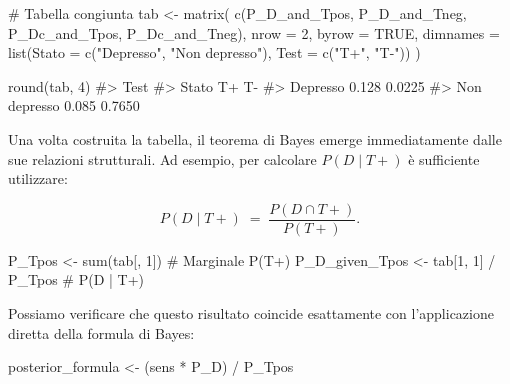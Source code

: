 \documentclass[
  letterpaper,
  DIV=11,
  numbers=noendperiod,
  oneside]{scrreprt}
\newenvironment{Shaded}{\begin{snugshade}}{\end{snugshade}}
\newcommand{\AttributeTok}[1]{\textcolor[rgb]{0.40,0.45,0.13}{#1}}
\newcommand{\CommentTok}[1]{\textcolor[rgb]{0.37,0.37,0.37}{#1}}
\newcommand{\ConstantTok}[1]{\textcolor[rgb]{0.56,0.35,0.01}{#1}}
\newcommand{\DecValTok}[1]{\textcolor[rgb]{0.68,0.00,0.00}{#1}}
\newcommand{\FunctionTok}[1]{\textcolor[rgb]{0.28,0.35,0.67}{#1}}
\newcommand{\NormalTok}[1]{\textcolor[rgb]{0.00,0.23,0.31}{#1}}
\newcommand{\OtherTok}[1]{\textcolor[rgb]{0.00,0.23,0.31}{#1}}
\newcommand{\SpecialCharTok}[1]{\textcolor[rgb]{0.37,0.37,0.37}{#1}}
\newcommand{\StringTok}[1]{\textcolor[rgb]{0.13,0.47,0.30}{#1}}
\theoremstyle{definition}
\theoremstyle{plain}
\theoremstyle{definition}
\theoremstyle{remark}
\begin{document}
\begin{Shaded}
\begin{Highlighting}[]
\CommentTok{\# Tabella congiunta}
\NormalTok{tab }\OtherTok{\textless{}{-}} \FunctionTok{matrix}\NormalTok{(}
  \FunctionTok{c}\NormalTok{(P\_D\_and\_Tpos, P\_D\_and\_Tneg, P\_Dc\_and\_Tpos, P\_Dc\_and\_Tneg),}
  \AttributeTok{nrow =} \DecValTok{2}\NormalTok{, }\AttributeTok{byrow =} \ConstantTok{TRUE}\NormalTok{,}
  \AttributeTok{dimnames =} \FunctionTok{list}\NormalTok{(}\AttributeTok{Stato =} \FunctionTok{c}\NormalTok{(}\StringTok{"Depresso"}\NormalTok{, }\StringTok{"Non depresso"}\NormalTok{), }\AttributeTok{Test =} \FunctionTok{c}\NormalTok{(}\StringTok{"T+"}\NormalTok{, }\StringTok{"T{-}"}\NormalTok{))}
\NormalTok{)}

\FunctionTok{round}\NormalTok{(tab, }\DecValTok{4}\NormalTok{)}
\CommentTok{\#\textgreater{}               Test}
\CommentTok{\#\textgreater{} Stato             T+     T{-}}
\CommentTok{\#\textgreater{}   Depresso     0.128 0.0225}
\CommentTok{\#\textgreater{}   Non depresso 0.085 0.7650}
\end{Highlighting}
\end{Shaded}

Una volta costruita la tabella, il teorema di Bayes emerge
immediatamente dalle sue relazioni strutturali. Ad esempio, per
calcolare \(P(D \mid T+)\) è sufficiente utilizzare:

\[
P(D \mid T+) \;=\; \frac{P(D \cap T+)}{P(T+)}.
\]

\begin{Shaded}
\begin{Highlighting}[]
\NormalTok{P\_Tpos }\OtherTok{\textless{}{-}} \FunctionTok{sum}\NormalTok{(tab[, }\DecValTok{1}\NormalTok{])              }\CommentTok{\# Marginale P(T+)}
\NormalTok{P\_D\_given\_Tpos }\OtherTok{\textless{}{-}}\NormalTok{ tab[}\DecValTok{1}\NormalTok{, }\DecValTok{1}\NormalTok{] }\SpecialCharTok{/}\NormalTok{ P\_Tpos }\CommentTok{\# P(D | T+)}
\end{Highlighting}
\end{Shaded}

Possiamo verificare che questo risultato coincide esattamente con
l'applicazione diretta della formula di Bayes:

\begin{Shaded}
\begin{Highlighting}[]
\NormalTok{posterior\_formula }\OtherTok{\textless{}{-}}\NormalTok{ (sens }\SpecialCharTok{*}\NormalTok{ P\_D) }\SpecialCharTok{/}\NormalTok{ P\_Tpos}
\end{Highlighting}
\end{Shaded}
\end{document}
